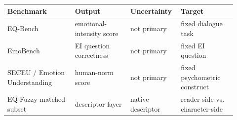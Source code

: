 \begin{tabular}{p{0.28\linewidth}p{0.23\linewidth}p{0.18\linewidth}p{0.23\linewidth}}
\hline
Benchmark & Output & Uncertainty & Target \\
\hline
EQ-Bench & emotional-intensity score & not primary & fixed dialogue task \\
EmoBench & EI question correctness & not primary & fixed EI question \\
SECEU / Emotion Understanding & human-norm score & not primary & fixed psychometric construct \\
EQ-Fuzzy matched subset & descriptor layer & native descriptor & reader-side vs. character-side \\
\hline
\end{tabular}
